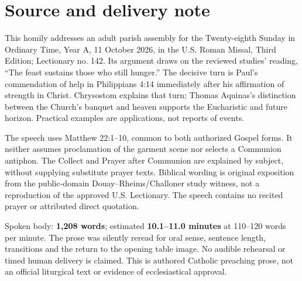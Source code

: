 \section{Source and delivery note}
This homily addresses an adult parish assembly for the Twenty-eighth Sunday in Ordinary Time, Year A, 11 October 2026, in the U.S. Roman Missal, Third Edition; Lectionary no. 142. Its argument draws on the reviewed studies' reading, ``The feast sustains those who still hunger.'' The decisive turn is Paul's commendation of help in Philippians 4:14 immediately after his affirmation of strength in Christ. Chrysostom explains that turn; Thomas Aquinas's distinction between the Church's banquet and heaven supports the Eucharistic and future horizon. Practical examples are applications, not reports of events.

The speech uses Matthew 22:1--10, common to both authorized Gospel forms. It neither assumes proclamation of the garment scene nor selects a Communion antiphon. The Collect and Prayer after Communion are explained by subject, without supplying substitute prayer texts. Biblical wording is original exposition from the public-domain Douay--Rheims/Challoner study witness, not a reproduction of the approved U.S. Lectionary. The speech contains no recited prayer or attributed direct quotation.

Spoken body: \textbf{1,208 words}; estimated \textbf{10.1--11.0 minutes} at 110--120 words per minute. The prose was silently reread for oral sense, sentence length, transitions and the return to the opening table image. No audible rehearsal or timed human delivery is claimed. This is authored Catholic preaching prose, not an official liturgical text or evidence of ecclesiastical approval.


